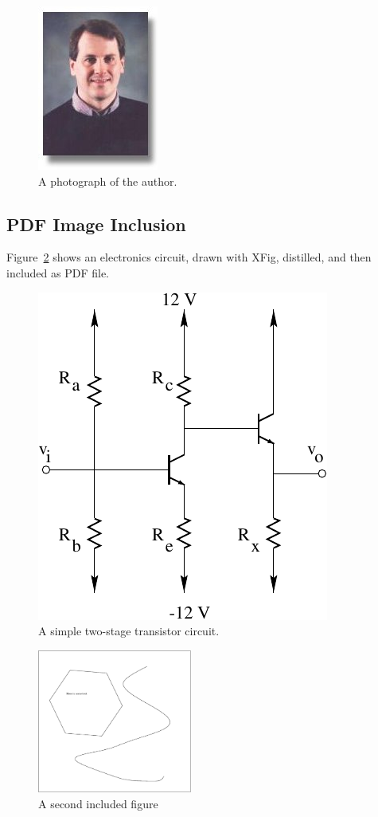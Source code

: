 \documentclass{article}
\begin{document}
\begin{figure}
  \begin{center}
    \includegraphics{mwicks.jpeg}
  \end{center}

  \caption{A photograph of the author.}
  \label{fig:author}
\end{figure}

\subsection{PDF Image Inclusion}
Figure~\ref{fig:circuit} shows
an electronics circuit,
drawn with XFig, distilled,
and then included as PDF file.
\begin{figure}
  \begin{center}
     \includegraphics{transistor}
  \end{center}

  \caption{A simple two-stage transistor circuit.}
  \label{fig:circuit}
\end{figure}

\begin{figure}
  \begin{center}
    \includegraphics[width=2.0in]{something.eps}
  \end{center}

  \caption{A second included figure}
  \label{fig:something}
\end{figure}
\end{document}
